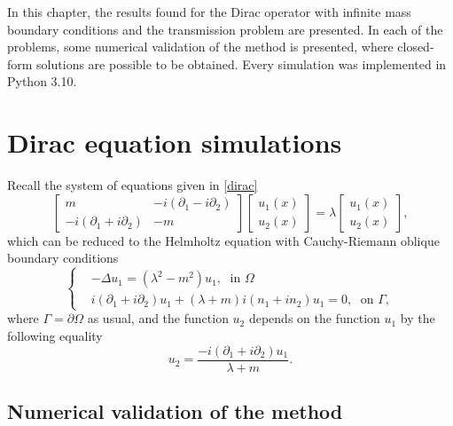\label{chap:implement}

In this chapter, the results found for the Dirac operator with infinite mass boundary conditions and the transmission problem are presented. In each of the problems, some numerical validation of the method is presented, where closed-form solutions are possible to be obtained. Every simulation was implemented in Python 3.10.

\section{Dirac equation simulations}\label{dirac_equation_simulations}

Recall the system of equations given in \eqref{dirac}
\begin{equation}
    \begin{bmatrix}
        m & -i(\partial_1 - i \partial_2)\\
        -i(\partial_1 + i \partial_2) & -m
    \end{bmatrix}
    \begin{bmatrix}
        u_1(x)\\
        u_2(x)
    \end{bmatrix}
    =\lambda
    \begin{bmatrix}
    u_1(x)\\
    u_2(x)
    \end{bmatrix},
\end{equation}
which can be reduced to the Helmholtz equation with Cauchy-Riemann oblique boundary conditions
\begin{equation*}
    \begin{cases}
        &-\Delta u_1 = (\lambda^2 - m^2)u_1, \; \text{ in } \Omega\\
        & i (\partial_1 + i\partial_2)u_1 + (\lambda + m)i(n_1 + i n_2)u_1 = 0, \; \text{ on } \Gamma,
    \end{cases}      
\end{equation*}
where \(\Gamma = \partial\Omega\) as usual, and the function \(u_2\) depends on the function \(u_1\) by the following equality
\[
    u_2 = \frac{-i (\partial_1 + i\partial_2)u_1}{\lambda + m}.    
\]
\subsection{Numerical validation of the method}

